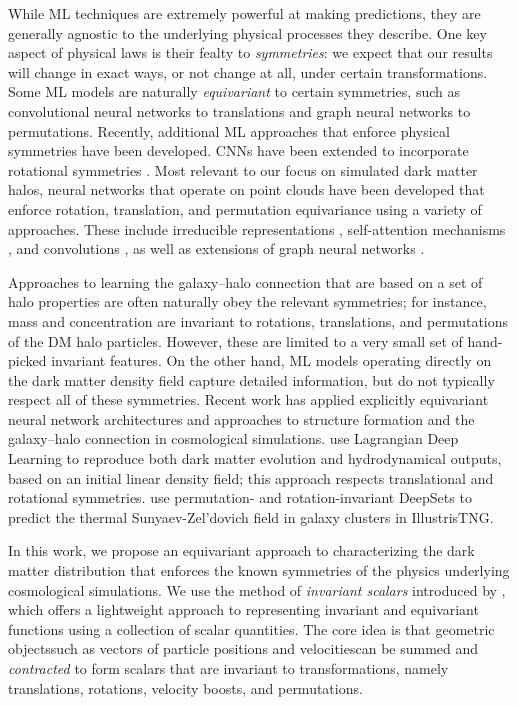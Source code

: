 While ML techniques are extremely powerful at making predictions, they are generally agnostic to the underlying physical processes they describe.
One key aspect of physical laws is their fealty to \emph{symmetries}: we expect that our results will change in exact ways, or not change at all, under certain transformations.
Some ML models are naturally \emph{equivariant} to certain symmetries, such as convolutional neural networks to translations and graph neural networks to permutations.
Recently, additional ML approaches that enforce physical symmetries have been developed.
CNNs have been extended to incorporate rotational symmetries \citep{cohen2019gauge,wang2021incorporating,ocampo_scalable_2023}.
Most relevant to our focus on simulated dark matter halos, neural networks that operate on point clouds have been developed that enforce rotation, translation, and permutation equivariance using a variety of approaches.
These include irreducible representations \citep{thomas2018tensor}, self-attention mechanisms \citep{fuchs2020se}, and convolutions \citep{kondor2018covariant,zhang2019rotation}, as well as extensions of graph neural networks \citep{Satorras2021}.

Approaches to learning the galaxy--halo connection that are based on a set of halo properties are often naturally obey the relevant symmetries; for instance, mass and concentration are invariant to rotations, translations, and permutations of the DM halo particles.
However, these are limited to a very small set of hand-picked invariant features.
On the other hand, ML models operating directly on the dark matter density field capture detailed information, but do not typically respect all of these symmetries.
Recent work has applied explicitly equivariant neural network architectures and approaches to structure formation and the galaxy--halo connection in cosmological simulations.
\cite{dai_learning_2020} use Lagrangian Deep Learning to reproduce both dark matter evolution and hydrodynamical outputs, based on an initial linear density field; this approach respects translational and rotational symmetries.
\cite{thiele_predicting_2022} use permutation- and rotation-invariant DeepSets to predict the thermal Sunyaev-Zel'dovich field in galaxy clusters in IllustrisTNG.

In this work, we propose an equivariant approach to characterizing the dark matter distribution that enforces the known symmetries of the physics underlying cosmological simulations. 
We use the method of \emph{invariant scalars} introduced by \cite{Villar2021a}, which offers a lightweight approach to representing invariant and equivariant functions using a collection of scalar quantities.
The core idea is that geometric objects{\emdash}such as vectors of particle positions and velocities{\emdash}can be summed and \emph{contracted} to form scalars that are invariant to transformations, namely translations, rotations, velocity boosts, and permutations.

